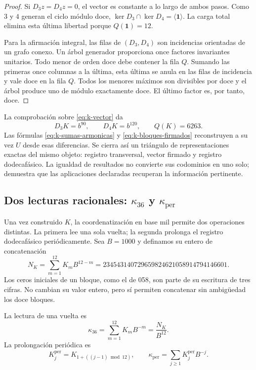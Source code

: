 \begin{proof}
Si \(D_3z=D_4z=0\), el vector es constante a lo largo de ambos pasos.
Como \(3\) y \(4\) generan el ciclo módulo doce,
\(\ker D_3\cap\ker D_4=\langle\mathbf1\rangle\). La carga total
elimina esta última libertad porque \(Q(\mathbf1)=12\).

Para la afirmación integral, las filas de \((D_3,D_4)\) son incidencias
orientadas de un grafo conexo. Un árbol generador proporciona once
factores invariantes unitarios. Todo menor de orden doce debe contener la
fila \(Q\). Sumando las primeras once columnas a la última, esta última
se anula en las filas de incidencia y vale doce en la fila \(Q\). Todos
los menores máximos son divisibles por doce y el árbol produce uno de
módulo exactamente doce. El último factor es, por tanto, doce.
\end{proof}

La comprobación sobre \eqref{eq:k-vector} da
\[
 D_3K=b^{90},\qquad D_4K=b^{120},\qquad Q(K)=6263.
\]
Las fórmulas \eqref{eq:k-sumas-armonicas} y
\eqref{eq:k-bloques-firmados} reconstruyen a su vez \(U\) desde esas
diferencias. Se cierra así un triángulo de representaciones exactas del
mismo objeto: registro transversal, vector firmado y registro dodecafásico. La igualdad
de resultados no convierte sus codominios en uno solo; demuestra que
las aplicaciones declaradas recuperan la información pertinente.



\subsection{Dos lecturas racionales: \texorpdfstring{\(\kappa_{36}\)}{kappa36} y \texorpdfstring{\(\kappa_{\mathrm{per}}\)}{kappa periódica}}
\label{subsec:k-kappas}

Una vez construido \(K\), la coordenatización en base mil permite dos operaciones
distintas. La primera lee una sola vuelta; la segunda prolonga el registro dodecafásico
periódicamente. Sea \(B=1000\) y definamos su entero de concatenación
\begin{equation}
 N_K=\sum_{m=1}^{12}K_mB^{12-m}
 =234543140729659824621058914794146601.
 \label{eq:k-numerador}
\end{equation}
Los ceros iniciales de un bloque, como el de 058, son parte de su escritura
de tres cifras. No cambian su valor entero, pero sí permiten concatenar
sin ambigüedad los doce bloques.

\begin{definition}
\label{def:k-kappas}
La lectura de una vuelta es
\[
 \kappa_{36}=\sum_{m=1}^{12}K_mB^{-m}=\frac{N_K}{B^{12}}.
\]
La prolongación periódica es
\[
 K_j^{\mathrm{per}}=K_{1+((j-1)\bmod12)},\qquad
 \kappa_{\mathrm{per}}=\sum_{j\geq1}K_j^{\mathrm{per}}B^{-j}.
\]
\end{definition}


